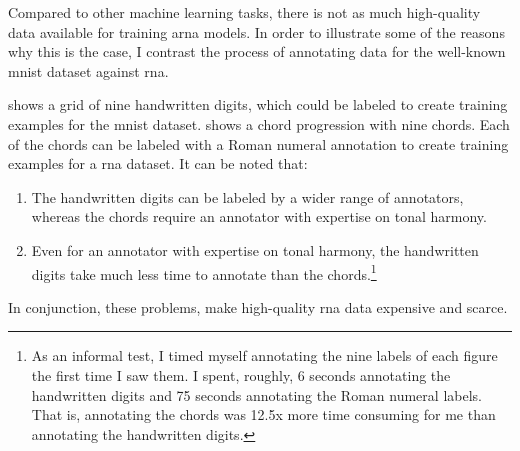 

Compared to other machine learning tasks, there is not as
much high-quality data available for training \gls{arna}
models. In order to illustrate some of the reasons why this
is the case, I contrast the process of annotating data for
the well-known \gls{mnist} dataset
\parencite{lecun1989handwritten} against \gls{rna}.


 shows a grid of nine handwritten digits,
which could be labeled to create training examples for the
\gls{mnist} dataset.  shows a chord
progression with nine chords. Each of the chords can be
labeled with a Roman numeral annotation to create training
examples for a \gls{rna} dataset. It can be noted that:

\begin{enumerate}
    \item The handwritten digits can be labeled by a wider
    range of annotators, whereas the chords require an
    annotator with expertise on tonal harmony.
    \item Even for an annotator with expertise on tonal
    harmony, the handwritten digits take much less time to
    annotate than the chords.\footnote{As an informal test, I
    timed myself annotating the nine labels of each figure
    the first time I saw them. I spent, roughly, 6 seconds
    annotating the handwritten digits and 75 seconds
    annotating the Roman numeral labels. That is, annotating
    the chords was 12.5x more time consuming for me than
    annotating the handwritten digits.}
\end{enumerate}

In conjunction, these problems, make high-quality \gls{rna}
data expensive and scarce.


